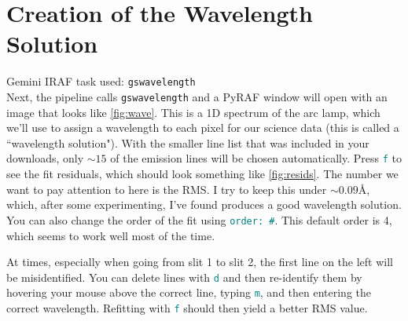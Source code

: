 \documentclass[12pt]{report}
\newcommand{\ty}[1]{\textcolor{teal}{\texttt{#1}}}
\begin{document}
\bigskip
\section{Creation of the Wavelength Solution}
\label{waves}

\noindent Gemini IRAF task used: \texttt{gswavelength}\\

\noindent Next, the pipeline calls \texttt{gswavelength} and a PyRAF window will open with an image that looks like \autoref{fig:wave}. This is a 1D spectrum of the arc lamp, which we'll use to assign a wavelength to each pixel for our science data (this is called a ``wavelength solution"). With the smaller line list that was included in your downloads, only $\sim 15$ of the emission lines will be chosen automatically. Press \ty{f} to see the fit residuals, which should look something like \autoref{fig:resids}. The number we want to pay attention to here is the RMS. I try to keep this under $\sim0.09$\AA, which, after some experimenting, I've found produces a good wavelength solution. You can also change the order of the fit using \ty{order: \#}. This default order is 4, which seems to work well most of the time. 

At times, especially when going from slit 1 to slit 2, the first line on the left will be misidentified. You can delete lines with \ty{d} and then re-identify them by hovering your mouse above the correct line, typing \ty{m}, and then entering the correct wavelength. Refitting with \ty{f} should then yield a better RMS value.
\end{document}
